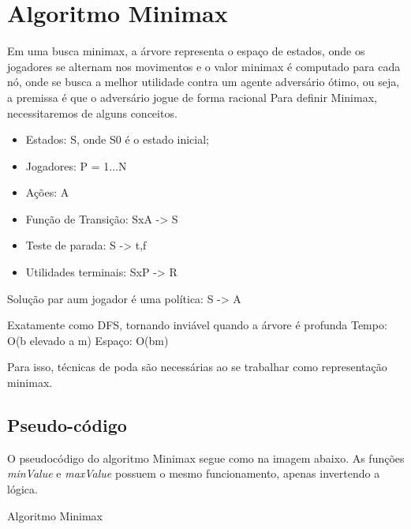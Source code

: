 \documentclass[sigplan,screen]{acmart}
\begin{document}
\section{Algoritmo Minimax}
Em uma busca minimax, a árvore representa o espaço de estados, onde os jogadores se alternam nos movimentos e o valor minimax é computado para cada nó, onde se busca a melhor utilidade contra um agente adversário ótimo, ou seja, a premissa é que o adversário jogue de forma racional
Para definir Minimax, necessitaremos de alguns conceitos.
\begin{itemize}
  \item{Estados: S, onde S0 é o estado inicial;}
  \item{Jogadores: P = {1...N}}
  \item{Ações: A}
  \item{Função de Transição: SxA -> S}
  \item{Teste de parada: S -> {t,f}}
  \item{Utilidades terminais: SxP -> R}
\end{itemize}

Solução par aum jogador é uma política: S -> A

Exatamente como DFS, tornando inviável quando a árvore é profunda
Tempo: O(b elevado a m)
Espaço: O(bm)

Para isso, técnicas de poda são necessárias ao se trabalhar como representação minimax.

\subsection{Pseudo-código}
O pseudocódigo do algoritmo Minimax segue como na imagem abaixo. 
As funções {\itshape minValue} e {\itshape maxValue} possuem o mesmo funcionamento, apenas invertendo a lógica.

\begin{algorithm}
\DontPrintSemicolon
  \caption{Algoritmo Minimax}
  \label{alg:generator}


\end{algorithm}
\end{document}
